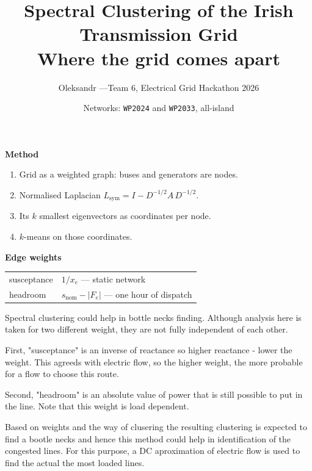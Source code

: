 \documentclass[11pt,a4paper]{article}
\title{\textbf{Spectral Clustering of the Irish Transmission Grid}\\[2mm]
\large Where the grid comes apart}
\author{Oleksandr \quad---\quad Team 6, Electrical Grid Hackathon 2026}
\date{Networks: \texttt{WP2024} and \texttt{WP2033}, all-island}
\newcommand{\Lsym}{L_{\mathrm{sym}}}
\begin{document}
\maketitle

\vspace{8mm}
\noindent
\begin{minipage}[t]{0.52\linewidth}
\textbf{Method}
\begin{enumerate}\itemsep2pt
  \item Grid as a weighted graph: buses and generators are nodes.
  \item Normalised Laplacian $\Lsym = I - D^{-1/2} A\, D^{-1/2}$.
  \item Its $k$ smallest eigenvectors as coordinates per node.
  \item $k$-means on those coordinates.
\end{enumerate}
\end{minipage}\hfill
\begin{minipage}[t]{0.44\linewidth}
\textbf{Edge weights}

\medskip
\begin{tabular}{@{}ll@{}}
\toprule
susceptance & $1/x_e$ --- static network\\
headroom    & $s_{\text{nom}} - |F_e|$ --- one hour of dispatch\\
\bottomrule
\end{tabular}

Spectral clustering could help in bottle necks finding. Although analysis here is taken for two different weight, 
they are not fully independent of each other. 

First, "susceptance" is an inverse of reactance so higher reactance - lower the weight. 
This agreeds with electric flow, so the higher weight, the more probable for a flow to choose this route.

Second, "headroom" is an absolute value of power that is still possible to put in the line. 
Note that this weight is load dependent.

Based on weights and the way of clusering the resulting clustering is expected to find a bootle necks 
and hence this method could help in identification of the congested lines. 
For this purpose, a DC aproximation of electric flow is used to find the actual the most loaded lines.
\end{minipage}

\newpage
\end{document}
